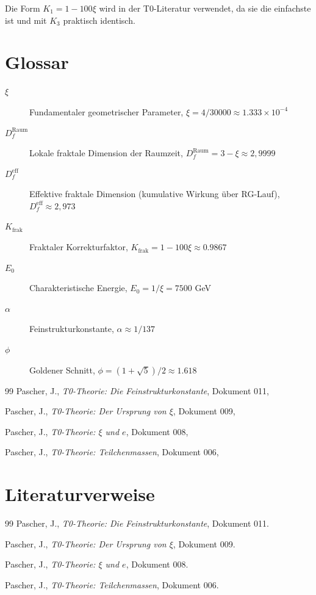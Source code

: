 	Die Form $K_1 = 1 - 100\xi$ wird in der T0-Literatur verwendet, da sie die einfachste ist und mit $K_3$ praktisch identisch.
	
	\appendix
	
	\section{Glossar}
	
	\begin{description}
		\item[$\xi$] Fundamentaler geometrischer Parameter, $\xi = 4/30000 \approx 1.333 \times 10^{-4}$
		\item[$D_f^{\text{Raum}}$] Lokale fraktale Dimension der Raumzeit, $D_f^{\text{Raum}} = 3 - \xi \approx 2{,}9999$
		\item[$D_f^{\text{eff}}$] Effektive fraktale Dimension (kumulative Wirkung über RG-Lauf), $D_f^{\text{eff}} \approx 2{,}973$
		\item[$K_{\text{frak}}$] Fraktaler Korrekturfaktor, $K_{\text{frak}} = 1 - 100\xi \approx 0.9867$
		\item[$E_0$] Charakteristische Energie, $E_0 = 1/\xi = 7500$ GeV
		\item[$\alpha$] Feinstrukturkonstante, $\alpha \approx 1/137$
		\item[$\phi$] Goldener Schnitt, $\phi = (1+\sqrt{5})/2 \approx 1.618$
	\end{description}
	

	
	\begin{thebibliography}{99}
		Pascher, J., \emph{T0-Theorie: Die Feinstrukturkonstante}, Dokument 011, 

		Pascher, J., \emph{T0-Theorie: Der Ursprung von $\xi$}, Dokument 009,

		Pascher, J., \emph{T0-Theorie: $\xi$ und $e$}, Dokument 008,

		Pascher, J., \emph{T0-Theorie: Teilchenmassen}, Dokument 006,
		
	\end{thebibliography}
	
	\section{Literaturverweise}
	
	\begin{thebibliography}{99}
		Pascher, J., \emph{T0-Theorie: Die Feinstrukturkonstante}, Dokument 011.
		
		Pascher, J., \emph{T0-Theorie: Der Ursprung von $\xi$}, Dokument 009.
		
		Pascher, J., \emph{T0-Theorie: $\xi$ und $e$}, Dokument 008.
		
		Pascher, J., \emph{T0-Theorie: Teilchenmassen}, Dokument 006.
		
	\end{thebibliography}

